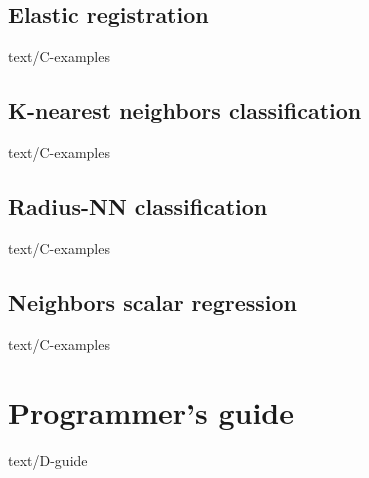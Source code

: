\documentclass[epsbased,copyleft,final,loe, lof,extendedindex,firstnumbered,tfg,english]{tfgtfmthesisuam}
\begin{document}
	\section{Elastic registration\label{EX:ELASTIC}}{text/C-examples}
	\section{K-nearest neighbors classification\label{EX:KNN}}{text/C-examples}
	\section{Radius-NN classification\label{EX:RNN}}{text/C-examples}
	\section{Neighbors scalar regression\label{EX:SCALARREG}}{text/C-examples}

\chapter{Programmer’s guide\label{CAP:GUIDE}}{text/D-guide}
\end{document}
